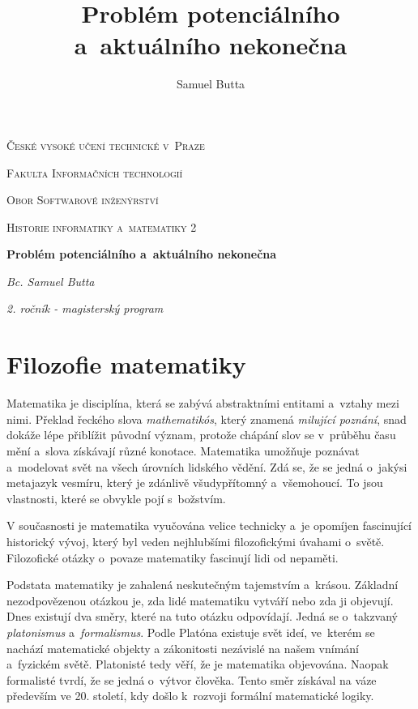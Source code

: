 \documentclass[czech]{article}
\begin{document}
\title{Problém potenciálního a~aktuálního nekonečna}
\author{Samuel Butta}

\begin{titlepage}
\centering
{\scshape\LARGE České vysoké učení technické v~Praze \par}
{\scshape\Large Fakulta Informačních technologií \par}
{\scshape\Large Obor Softwarové inženýrství \par}
\vspace{1cm}
{\scshape\Large Historie informatiky a~matematiky 2\par} 

\vspace{1.5cm}
{\huge\bfseries Problém potenciálního a~aktuálního nekonečna\par}
\vspace{2cm}
{\Large\itshape Bc. Samuel Butta\par}
{\normalsize\itshape 2. ročník - magisterský program\par}
\end{titlepage}

\section*{Filozofie matematiky}

Matematika je disciplína, která se zabývá abstraktními entitami a~vztahy mezi nimi. Překlad řeckého slova \textit{mathematikós}, který znamená \textit{milující poznání}, snad dokáže lépe přiblížit původní význam, protože chápání slov se v~průběhu času mění a~slova získávají různé konotace. Matematika umožňuje poznávat a~modelovat svět na všech úrovních lidského vědění. Zdá se, že se jedná o~jakýsi metajazyk vesmíru, který je zdánlivě všudypřítomný a~všemohoucí. To jsou vlastnosti, které se obvykle pojí s~božstvím. \cite{livio}

V současnosti je matematika vyučována velice technicky a~je opomíjen fascinující historický vývoj, který byl veden nejhlubšími filozofickými úvahami o~světě. Filozofické otázky o~povaze matematiky fascinují lidi od nepaměti. 

Podstata matematiky je zahalená neskutečným tajemstvím a~krásou. Základní nezodpovězenou otázkou je, zda lidé matematiku vytváří nebo zda ji objevují.
Dnes existují dva směry, které na tuto otázku odpovídají. Jedná se o~takzvaný \textit{platonismus} a~\textit{formalismus}. Podle Platóna existuje svět ideí, ve~kterém se nachází matematické objekty a zákonitosti nezávislé na našem vnímání a~fyzickém světě.
Platonisté tedy věří, že je matematika objevována. Naopak formalisté tvrdí, že se jedná o~výtvor člověka. Tento směr získával na váze především ve 20. století, kdy došlo k~rozvoji formální matematické logiky.
\end{document}
